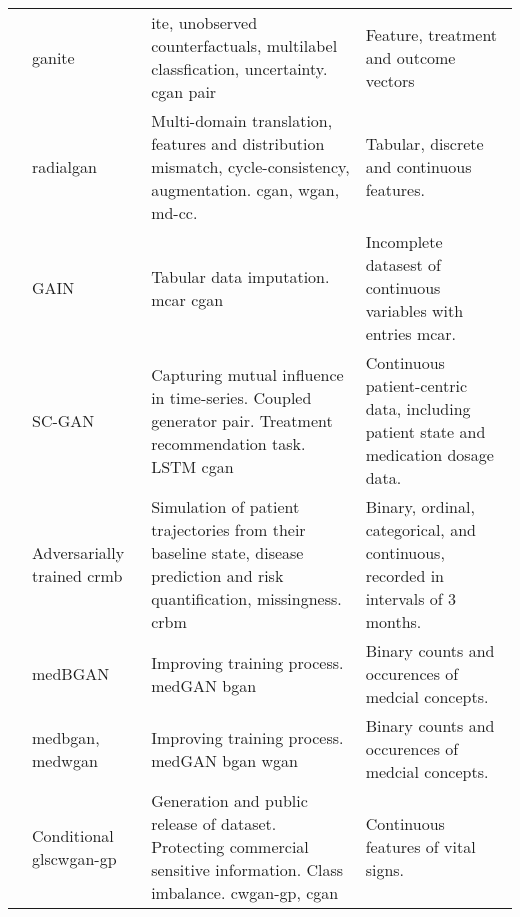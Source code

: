 \begin{sidewaystable}[htbp]
\begin{tabularx}{\textwidth}{@{}p{4cm}XXX@{}}
            \cite{Yoon2018-ite} 
            & \gls{ganite} 
            & \gls{ite}, unobserved counterfactuals, multilabel classfication, uncertainty. \gls{cgan} pair
            & Feature, treatment and outcome vectors\\
            
            \cite{Yoon2018-radial}
            & \gls{radialgan} 
            & Multi-domain translation, features and distribution mismatch, cycle-consistency, augmentation. \gls{cgan}, \gls{wgan}, \gls{md-cc}.
            & Tabular, discrete and continuous features.\\
            
            \cite{yoon2018imputation}
            & GAIN
            & Tabular data imputation. \gls{mcar} \gls{cgan}
            & Incomplete datasest of continuous variables with entries \gls{mcar}.\\
            
            
            \cite{Wang_2019}
            & \gls{SC-GAN}
            & Capturing mutual influence in time-series. Coupled generator pair. Treatment recommendation task.  \gls{LSTM} \gls{cgan}
            & Continuous patient-centric data, including patient state and medication dosage data.\\
            
            \cite{Fisher2019}
            & Adversarially trained \gls{crmb}
            & Simulation of patient trajectories from their baseline state, disease prediction and risk quantification, missingness. \gls{crbm}
            &  Binary, ordinal, categorical, and continuous, recorded in intervals of 3 months.\\
            
            \cite{baowaly_2019_IEEE}
            & \gls{medBGAN}
            & Improving training process. \gls{medGAN} \gls{bgan}
            & Binary counts and occurences of medcial concepts.\\
            
            \cite{baowaly_2019_jamia}
            & \gls{medbgan}, \gls{medwgan}
            & Improving training process. \gls{medGAN} \gls{bgan} \gls{wgan}
            & Binary counts and occurences of medcial concepts.\\
            
            \cite{severo2019ward2icu}
            & Conditional gls{cwgan-gp} 
            & Generation and public release of dataset. Protecting commercial sensitive information. Class imbalance. \gls{cwgan-gp}, \gls{cgan}
            & Continuous features of vital signs.
            

\end{tabularx}
\end{sidewaystable}

